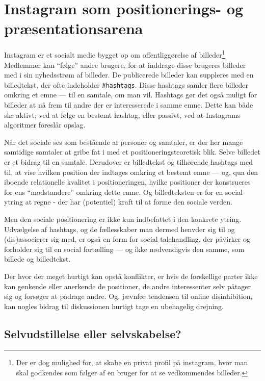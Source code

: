 \section{Instagram som positionerings- og præsentationsarena}
Instagram er et socialt medie bygget op om offentliggørelse af 
billeder\footnote{Der er dog mulighed for, at skabe en privat 
profil på instagram, hvor man skal godkendes som følger af en 
bruger for at se vedkommendes billeder.} Medlemmer kan “følge” 
andre brugere, for at inddrage disse brugeres billeder med i sin 
nyhedsstrøm af billeder. De publicerede billeder kan suppleres med 
en billedtekst, der ofte indeholder \texttt{\#hashtags}. Disse 
hashtags samler flere billeder omkring et emne — til en samtale, 
om man vil. Hashtags gør det også muligt for billeder at nå frem 
til andre der er interesserede i samme emne. Dette kan både ske 
aktivt; ved at følge en bestemt hashtag, eller passivt, ved at 
Instagrams algoritmer foreslår opslag.

Når det sociale ses som bestående af personer og samtaler, er der 
her mange samtidige samtaler at gribe fat i med et 
positioneringsteoretisk blik. Selve billedet er et bidrag til en 
samtale. Derudover er billedtekst og tilhørende hashtags med til, 
at vise hvilken position der indtages omkring et bestemt emne — 
og, qua den iboende relationelle kvalitet i positioneringen, 
hvilke positioner der konstrueres for ens “modstandere” omkring 
dette emne. Og billedteksten er for en social ytring at regne - 
der har (potentiel) kraft til at forme den sociale verden.

Men den sociale positionering er ikke kun indbefattet i den 
konkrete ytring. Udvælgelse af hashtags, og de fællesskaber man 
dermed henvder sig til og (dis)associerer sig med, er også en form 
for social talehandling, der påvirker og forholder sig til en 
social fortælling — og ikke nødvendigvis den samme, som billede og 
billedtekst.

Der hvor der meget hurtigt kan opstå konflikter, er hvis de 
forskellige parter ikke kan genkende eller anerkende de 
positioner, de andre interessenter selv påtager sig og forsøger at 
pådrage andre. Og, jævnfør tendensen til online disinhibition, kan 
nogles bidrag til diskussionen hurtigt tage en ubehagelig 
drejning.


\subsection{Selvudstillelse eller selvskabelse?}

